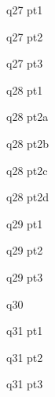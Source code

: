 \documentclass{article}
\begin{document}
\newpage
{}

\begin{qu}
    q27 pt1
\end{qu}

\begin{qu}
    q27 pt2
\end{qu}

\begin{qu}
    q27 pt3
\end{qu}

\newpage
{}

\begin{qu}
    q28 pt1
\end{qu}

\begin{qu}
    q28 pt2a
\end{qu}

\begin{qu}
    q28 pt2b
\end{qu}

\begin{qu}
    q28 pt2c
\end{qu}

\begin{qu}
    q28 pt2d
\end{qu}

\newpage
{}

\begin{qu}
    q29 pt1
\end{qu}

\begin{qu}
    q29 pt2
\end{qu}

\begin{qu}
    q29 pt3
\end{qu}

\newpage
{}

\begin{qu}
    q30
\end{qu}

\newpage
{}

\begin{qu}
    q31 pt1
\end{qu}

\begin{qu}
    q31 pt2
\end{qu}

\begin{qu}
    q31 pt3
\end{qu}
\end{document}
